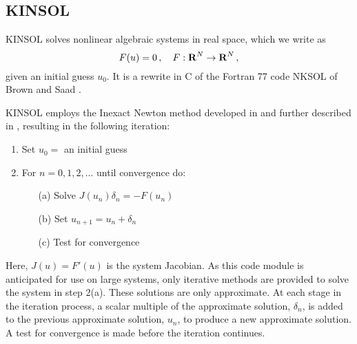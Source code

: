\subsection{KINSOL}\label{ss:kinsol}

KINSOL solves nonlinear algebraic systems in real space, which we write as
\begin{equation}\label{nonlinear_system}
  F(u) = 0 \, , \quad F:\mbox{\bf R}^N \rightarrow \mbox{\bf R}^N \, , 
\end{equation}
given an initial guess $u_0$.  It is a rewrite in C of the Fortran 77
code NKSOL of Brown and Saad \cite{BrSa:90}.

KINSOL employs the Inexact Newton method developed in 
\cite{BrSa:90,Bro:87,DES:82} 
and further described in \cite{DeSc:96,Kel:95}, 
resulting in the following iteration:

\vspace{1ex}
\begin{enumerate}
   \item Set $u_0 = $ an initial guess
   \item For $n = 0, 1, 2,...$ until convergence do:
      \begin{itemize}
          \item[(a)] Solve $J(u_n)\delta_n = - F(u_n)$ 
          \item[(b)] Set $u_{n+1} = u_n + \delta_n$
          \item[(c)] Test for convergence
      \end{itemize}
\end{enumerate}
Here, $J(u) = F'(u)$ is the system Jacobian. As this code module is
anticipated for use on large systems, only iterative methods are
provided to solve the system in step 2(a). These solutions are only
approximate.  At each stage in the iteration process, a scalar
multiple of the approximate solution, $\delta_n$, is added to the
previous approximate solution, $u_n$, to produce a new approximate
solution. A test for convergence is made before the iteration
continues.

